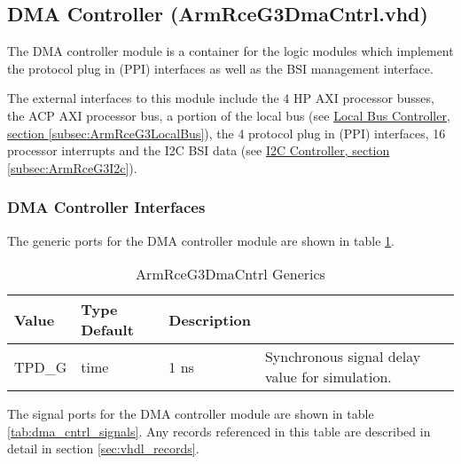 \documentclass[11pt]{article}
\begin{document}
\subsection{DMA Controller (ArmRceG3DmaCntrl.vhd)}
\label{subsec:ArmRceG3DmaCntrl}

The DMA controller module is a container for the logic modules which implement the protocol plug in (PPI) interfaces as well
as the BSI management interface. 

The external interfaces to this module include the 4 HP AXI processor busses, the ACP AXI processor bus, 
a portion of the local bus (see \hyperref[subsec:ArmRceG3LocalBus]{Local Bus Controller, section \ref*{subsec:ArmRceG3LocalBus}}), 
the 4 protocol plug in (PPI) interfaces, 16 processor interrupts and the I2C BSI data 
(see \hyperref[subsec:ArmRceG3I2c]{I2C Controller, section \ref*{subsec:ArmRceG3I2c}}).  

\subsubsection{DMA Controller Interfaces}

The generic ports for the DMA controller module are shown in table \ref{tab:dma_cntrl_generics}.

\begin{table}[H]
\small
\centering
   \begin{tabular}{| l | l | l | l | }
      \hline \textbf{Value} & \textbf{Type} \textbf{Default} & \textbf{Description} \\
      \hline TPD\_G          & time     & 1 ns & Synchronous signal delay value for simulation.   \\
      \hline
   \end{tabular}
   \caption{ArmRceG3DmaCntrl Generics}
   \label{tab:dma_cntrl_generics}
\end{table}

The signal ports for the DMA controller module are shown in table \ref{tab:dma_cntrl_signals}. 
Any records referenced in this table are described in detail in section \ref{sec:vhdl_records}. 
\end{document}
